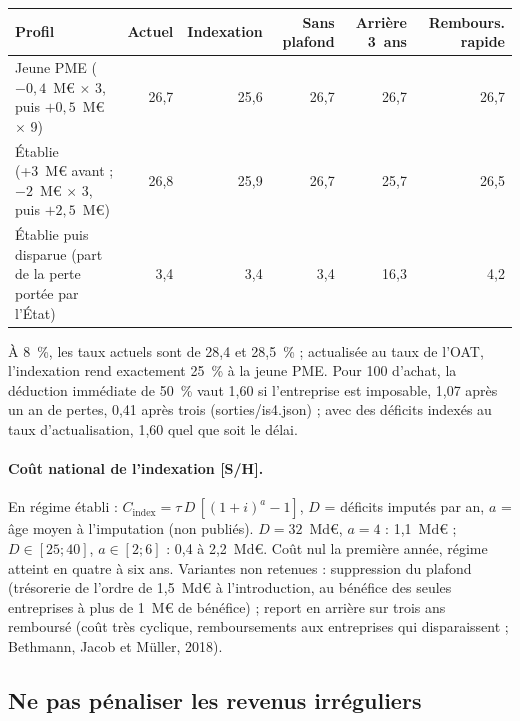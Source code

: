 \begin{center}\small\setlength{\tabcolsep}{4pt}\begin{tabular}{@{}lrrrrr@{}}\toprule
Profil & Actuel & Indexation & Sans plafond & Arrière 3~ans & Rembours. rapide \\\midrule
Jeune PME ($-0{,}4$~M€ $\times$ 3, puis $+0{,}5$~M€ $\times$ 9) & 26,7 & 25,6 & 26,7 & 26,7 & 26,7 \\
Établie (+3~M€ avant ; $-2$~M€ $\times$ 3, puis $+2{,}5$~M€) & 26,8 & 25,9 & 26,7 & 25,7 & 26,5 \\
Établie puis disparue (part de la perte portée par l'État) & 3,4 & 3,4 & 3,4 & 16,3 & 4,2 \\\bottomrule
\end{tabular}\end{center}
À 8~\%, les taux actuels sont de 28,4 et 28,5~\% ; actualisée au taux de l'OAT, l'indexation rend exactement 25~\% à
la jeune PME. Pour 100 d'achat, la déduction immédiate de 50~\% vaut 1,60 si l'entreprise est imposable, 1,07 après un an
de pertes, 0,41 après trois (sorties/is4.json) ; avec des déficits indexés au taux d'actualisation, 1,60 quel que soit
le délai.

\paragraph{Coût national de l'indexation [S/H].} En régime établi : $C_{\mathrm{index}} = \tau\, D\, [(1+i)^a - 1]$,
$D$ = déficits imputés par an, $a$ = âge moyen à l'imputation (non publiés). $D = 32$~Md€, $a = 4$ : 1,1~Md€ ;
$D \in [25 ; 40]$, $a \in [2 ; 6]$ : 0,4 à 2,2~Md€. Coût nul la première année, régime atteint en quatre à six ans.
Variantes non retenues : suppression du plafond (trésorerie de l'ordre de 1,5~Md€ à l'introduction, au bénéfice des
seules entreprises à plus de 1~M€ de bénéfice) ; report en arrière sur trois ans remboursé (coût très cyclique,
remboursements aux entreprises qui disparaissent ; Bethmann, Jacob et Müller, 2018).

\subsection{Ne pas pénaliser les revenus irréguliers}\label{ann:pal-revenus}

